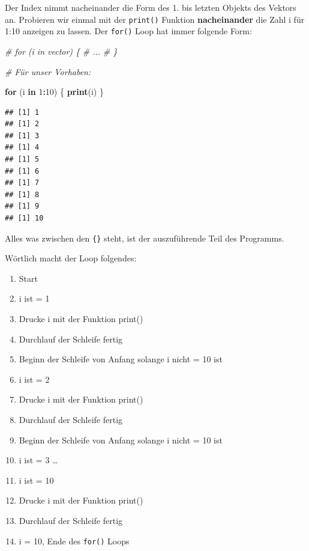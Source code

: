 \documentclass[
]{book}
\newenvironment{Shaded}{\begin{snugshade}}{\end{snugshade}}
\newcommand{\CommentTok}[1]{\textcolor[rgb]{0.56,0.35,0.01}{\textit{#1}}}
\newcommand{\ControlFlowTok}[1]{\textcolor[rgb]{0.13,0.29,0.53}{\textbf{#1}}}
\newcommand{\DecValTok}[1]{\textcolor[rgb]{0.00,0.00,0.81}{#1}}
\newcommand{\FunctionTok}[1]{\textcolor[rgb]{0.13,0.29,0.53}{\textbf{#1}}}
\newcommand{\NormalTok}[1]{#1}
\newcommand{\SpecialCharTok}[1]{\textcolor[rgb]{0.81,0.36,0.00}{\textbf{#1}}}
\providecommand{\tightlist}{%
  \setlength{\itemsep}{0pt}\setlength{\parskip}{0pt}}
\begin{document}
Der Index nimmt nacheinander die Form des 1. bis letzten Objekts des Vektors an. Probieren wir einmal mit der \texttt{print()} Funktion \textbf{nacheinander} die Zahl i für 1:10 anzeigen zu lassen. Der \texttt{for()} Loop hat immer folgende Form:

\begin{Shaded}
\begin{Highlighting}[]
\CommentTok{\# for (i in vector) \{}
\CommentTok{\#   ...}
\CommentTok{\# \}}

\CommentTok{\# Für unser Vorhaben:}

\ControlFlowTok{for}\NormalTok{ (i }\ControlFlowTok{in} \DecValTok{1}\SpecialCharTok{:}\DecValTok{10}\NormalTok{) \{}
  \FunctionTok{print}\NormalTok{(i)}
\NormalTok{\}}
\end{Highlighting}
\end{Shaded}

\begin{verbatim}
## [1] 1
## [1] 2
## [1] 3
## [1] 4
## [1] 5
## [1] 6
## [1] 7
## [1] 8
## [1] 9
## [1] 10
\end{verbatim}

Alles was zwischen den \texttt{\{\}} steht, ist der auszuführende Teil des Programms.

Wörtlich macht der Loop folgendes:

\begin{enumerate}
\def\labelenumi{\arabic{enumi}.}
\tightlist
\item
  Start
\item
  i ist = 1
\item
  Drucke i mit der Funktion print()
\item
  Durchlauf der Schleife fertig
\item
  Beginn der Schleife von Anfang solange i nicht = 10 ist
\item
  i ist = 2
\item
  Drucke i mit der Funktion print()
\item
  Durchlauf der Schleife fertig
\item
  Beginn der Schleife von Anfang solange i nicht = 10 ist
\item
  i ist = 3 \ldots{}
\item
  i ist = 10
\item
  Drucke i mit der Funktion print()
\item
  Durchlauf der Schleife fertig
\item
  i = 10, Ende des \texttt{for()} Loops
\end{enumerate}
\end{document}
